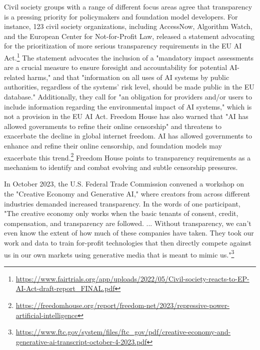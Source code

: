 Civil society groups with a range of different focus areas agree that transparency is a pressing priority for policymakers and foundation model developers.
For instance, 123 civil society organizations, including AccessNow, Algorithm Watch, and the European Center for Not-for-Profit Law, released a statement advocating for the prioritization of more serious transparency requirements in the EU AI Act.\footnote{\url{https://www.fairtrials.org/app/uploads/2022/05/Civil-society-reacts-to-EP-AI-Act-draft-report_FINAL.pdf}}
The statement advocates the inclusion of a "mandatory impact assessments are a
crucial measure to ensure foresight and accountability for potential AI-related harms," and that "information on all uses of AI systems by public authorities, regardless of
the systems’ risk level, should be made public in the EU database." 
Additionally, they call for "an obligation for providers and/or users to include
information regarding the environmental impact of AI systems," which is not a provision in the EU AI Act.
Freedom House has also warned that "AI has allowed governments to refine their online censorship" and threatens to exacerbate the decline in global internet freedom.
AI has allowed governments to enhance and refine their online censorship, and foundation models may exacerbate this trend.\footnote{\url{https://freedomhouse.org/report/freedom-net/2023/repressive-power-artificial-intelligence}}
Freedom House points to transparency requirements as a mechanism to identify and combat evolving and subtle censorship pressures.


In October 2023, the U.S. Federal Trade Commission convened a workshop on the "Creative Economy and Generative AI," where creators from across different industries demanded increased transparency. In the words of one participant, "The creative economy only works when the basic tenants of consent, credit, compensation, and transparency are followed. ... Without transparency, we can't even know the extent of how much of these companies have taken. They took our work and data to train for-profit technologies that then directly compete against us in our own markets using generative media that is meant to mimic us."\footnote{\url{https://www.ftc.gov/system/files/ftc_gov/pdf/creative-economy-and-generative-ai-transcript-october-4-2023.pdf}} 

